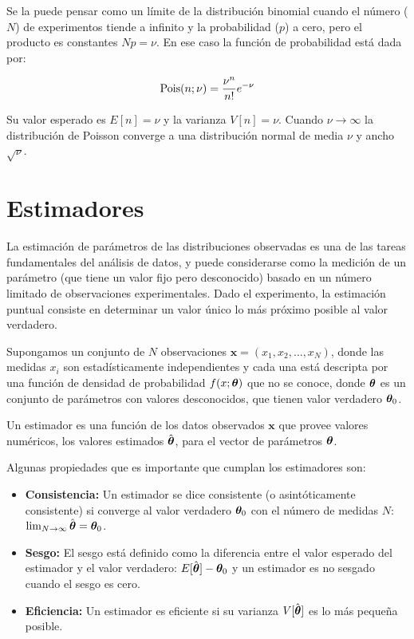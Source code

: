Se la puede pensar como un límite de la distribución binomial cuando el número ($N$)
de experimentos tiende a infinito y la probabilidad ($p$) a cero, pero el producto es
constantes $Np = \nu$. En ese caso la función de probabilidad está dada por:

\begin{equation}
  \operatorname{Pois}(n;\nu) = \frac{\nu^n}{n!} e^{-\nu}
\end{equation}

Su valor esperado es $E[n] = \nu$ y la varianza $V[n] = \nu$.
Cuando $\nu \to \infty$ la distribución de Poisson converge a una distribución
normal de media $\nu$ y ancho $\sqrt{\nu}$.


\section{Estimadores}

La estimación de parámetros de las distribuciones observadas es una de las
tareas fundamentales del análisis de datos, y puede considerarse como la
medición de un parámetro (que tiene un valor fijo pero desconocido) basado en un
número limitado de observaciones experimentales. Dado el experimento, la
estimación puntual consiste en determinar un valor único lo más próximo posible al
valor verdadero.

Supongamos un conjunto de $N$ observaciones $\bm{x} = (x_1, x_2, \ldots, x_N)$,
donde las medidas $x_i$ son estadísticamente independientes y cada una está
descripta por una función de densidad de probabilidad $f(x;\bm{\theta})$ que no
se conoce, donde $\bm{\theta}$ es un conjunto de parámetros con valores
desconocidos, que tienen valor verdadero $\bm{\theta}_0$.

Un estimador es una función de los datos observados $\bm{x}$ que provee
valores numéricos, los valores estimados $\hat{\bm{\theta}}$, para el vector de
parámetros $\bm{\theta}$.

Algunas propiedades que es importante que cumplan los estimadores son:

\begin{itemize}\itemsep0.2cm\parskip0.2cm
\item {\bf Consistencia:} Un estimador se dice consistente (o asintóticamente
  consistente) si converge al valor verdadero $\bm{\theta}_{0}$ con el número de
  medidas $N$: $\lim_{N \rightarrow \infty} \hat{\bm{\theta}} = \bm{\theta}_0$.

\item {\bf Sesgo:} El sesgo está definido como la diferencia entre el valor
  esperado del estimador y el valor verdadero: $E[\hat{\bm{\theta}}] - \bm{\theta}_0$ y
  un estimador es no sesgado cuando el sesgo es cero.

\item {\bf Eficiencia:} Un estimador es eficiente si su varianza
  $V[\hat{\bm{\theta}}]$ es lo más peque\~na posible.
\end{itemize}

